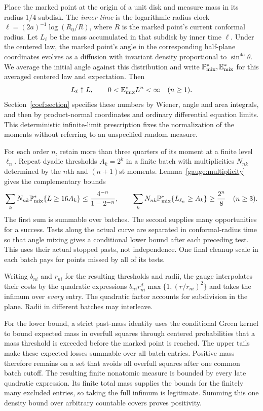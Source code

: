 Place the marked point at the origin of a unit disk and measure mass in
its radius-$1/4$ subdisk. The \emph{inner time} is the logarithmic radius
clock $\ell=(2a)^{-1}\log(R_0/R)$, where $R$ is the marked point's current
conformal radius. Let $L_\ell$ be the mass accumulated in that subdisk
by inner time $\ell$. Under the centered law, the marked point's angle
in the corresponding half-plane coordinates evolves as a diffusion
with invariant density proportional to
$\sin^{4a}\theta$. We average the initial angle against this distribution
and write
$\mathbb P_{\mathrm{mix}}^*,\mathbb E_{\mathrm{mix}}^*$ for this averaged centered
law and expectation. Then
\[
 L_\ell\uparrow L,\qquad 0<\mathbb E_{\mathrm{mix}}^*L^n<\infty\quad(n\ge1).
\]
Section~\ref{coef:section} specifies these numbers by Wiener, angle and
area integrals, and then by product-normal coordinates and ordinary
differential equation limits. This deterministic infinite-limit
prescription fixes the normalization
of the moments without referring to an unspecified random measure.

For each order $n$, retain more than three quarters of its moment at a
finite level $\ell_n$. Repeat dyadic thresholds $A_k=2^k$ in a finite
batch with multiplicities $N_{nk}$ determined by the $n$th and
$(n+1)$st moments. Lemma~\ref{gauge:multiplicity} gives the complementary
bounds
\[
 \sum_kN_{nk}\mathbb P_{\mathrm{mix}}^*\{L\ge16A_k\}
 \le\frac{4^{-n}}{1-2^{-n}},\qquad
 \sum_kN_{nk}\mathbb P_{\mathrm{mix}}^*\{L_{\ell_n}\ge A_k\}\ge\frac{2^n}{8}
 \quad(n\ge3).
\]
The first sum is summable over batches. The second supplies many
opportunities for a success. Tests along the actual curve are separated
in conformal-radius time so that angle mixing gives a conditional lower
bound after each preceding test. This uses their actual stopped pasts,
not independence. One final cleanup scale in each batch pays for points
missed by all of its tests.

Writing $b_{ni}$ and $r_{ni}$ for the resulting thresholds and radii,
the gauge interpolates their costs by the quadratic expressions
$b_{ni}r_{ni}^d\max\{1,(r/r_{ni})^2\}$ and takes the infimum over
\emph{every} entry. The quadratic factor accounts for subdivision in
the plane. Radii in different batches may interleave.

For the lower bound, a strict past-mass identity uses the conditional
Green kernel to bound expected mass in overfull squares through centered
probabilities that a mass threshold is exceeded before the marked point
is reached. The upper tails make these expected losses summable over
all batch entries. Positive mass
therefore remains on a set that avoids all overfull squares after one
common batch cutoff. The resulting finite nonatomic measure is bounded
by every late quadratic expression. Its finite total mass supplies the
bounds for the finitely many excluded entries, so taking the full
infimum is legitimate. Summing this one density bound over arbitrary
countable covers proves positivity.

